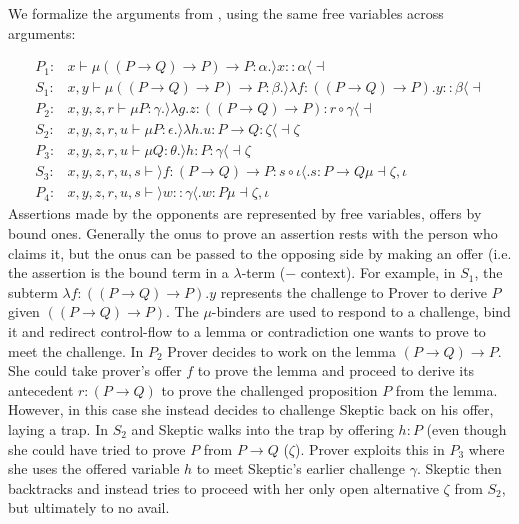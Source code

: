 \documentclass{IOS-Book-Article}
\begin{document}
\begin{example}\label{ex:prover-skeptic-arguments}
  We formalize the arguments from , using the same free variables across arguments:

  \begin{align}
    \label{eq:2}
    P_1: & x \vdash \mu ((P\rightarrow Q)\rightarrow P)\rightarrow P: \alpha.\rangle x :: \alpha \langle \dashv  \\
    S_1: & x,y \vdash \mu ((P\rightarrow Q)\rightarrow P)\rightarrow P: \beta. \rangle \lambda f:((P\rightarrow Q)\rightarrow P).y :: \beta \langle \dashv \\
    P_2: & x,y,z,r \vdash \mu P:\gamma.\rangle \lambda g.z :((P\rightarrow Q)\rightarrow P): r \circ \gamma \langle \dashv \\
    S_2: & x,y,z,r,u \vdash \mu P: \epsilon.\rangle \lambda h.u :P\rightarrow Q: \zeta \langle \dashv \zeta\\
    P_3: & x,y,z,r,u \vdash \mu Q:\theta.\rangle h :P: \gamma \langle \dashv \zeta\\
    S_3: & x,y,z,r,u,s \vdash \rangle f :(P\rightarrow Q)\rightarrow P: s \circ \iota \langle.s:P\rightarrow Q \mu \dashv \zeta, \iota \\
    P_4: & x,y,z,r,u,s\vdash \rangle w :: \gamma \langle. w:P \mu \dashv \zeta, \iota
  \end{align}
  Assertions made by the opponents are represented by free variables, offers by bound ones. Generally the onus to prove an assertion rests with the person who claims it, but the onus can be passed to the opposing side by making an offer (i.e. the assertion is the bound term in a $\lambda$-term ($-$ context). For example, in $S_1$, the subterm $\lambda f:((P\rightarrow Q)\rightarrow P).y$ represents the challenge to Prover to derive $P$ given $((P\rightarrow Q)\rightarrow P)$.
  The $\mu$-binders are used to respond to a challenge, bind it and redirect control-flow to a lemma or contradiction one wants to prove to meet the challenge.
  In $P_2$ Prover decides to work on the lemma $(P\rightarrow Q)\rightarrow P$. She could take prover's offer $f$ to prove the lemma and proceed to derive its antecedent $r:(P\rightarrow Q)$ to prove the challenged proposition $P$ from the lemma. However, in this case she instead decides to challenge Skeptic back on his offer, laying a trap.
  In $S_2$ and Skeptic walks into the trap by offering $h:P$ (even though she could have tried to prove $P$ from $P\rightarrow Q$ ($\zeta$).
  Prover exploits this in $P_3$ where she uses the offered variable $h$ to meet Skeptic's earlier challenge $\gamma$.
  Skeptic then backtracks and instead tries to proceed with her only open alternative $\zeta$ from $S_2$, but ultimately to no avail.
\end{example}
\end{document}
